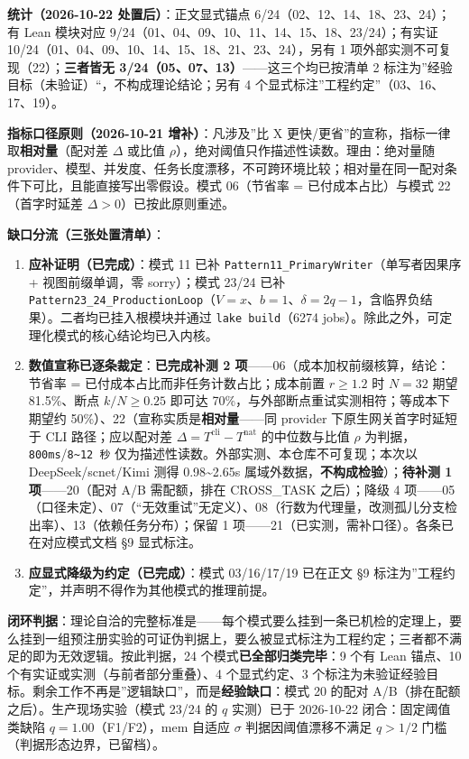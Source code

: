 \textbf{统计（2026-10-22 处置后）}：正文显式锚点
6/24（02、12、14、18、23、24）；有 Lean 模块对应
9/24（01、04、09、10、11、14、15、18、23/24）；有实证
10/24（01、04、09、10、14、15、18、21、23、24），另有 1
项外部实测不可复现（22）；\textbf{三者皆无
3/24（05、07、13）}------这三个均已按清单 2
标注为''经验目标（未验证）``，不构成理论结论；另有 4
个显式标注''工程约定''（03、16、17、19）。

\textbf{指标口径原则（2026-10-21 增补）}：凡涉及''比 X
更快/更省''的宣称，指标一律取\textbf{相对量}（配对差 \(\Delta\) 或比值
\(\rho\)），绝对阈值只作描述性读数。理由：绝对量随
provider、模型、并发度、任务长度漂移，不可跨环境比较；相对量在同一配对条件下可比，且能直接写出零假设。模式
06（节省率 = 已付成本占比）与模式 22（首字时延差
\(\Delta>0\)）已按此原则重述。

\textbf{缺口分流（三张处置清单）}：

\begin{enumerate}
\def\labelenumi{\arabic{enumi}.}
\tightlist
\item
  \textbf{应补证明（已完成）}：模式 11 已补
  \texttt{Pattern11\_PrimaryWriter}（单写者因果序 + 视图前缀单调，零
  sorry）；模式 23/24 已补
  \texttt{Pattern23\_24\_ProductionLoop}（\(V=x\)、\(b=1\)、\(\delta=2q-1\)，含临界负结果）。二者均已挂入根模块并通过
  \texttt{lake\ build}（6274
  jobs）。除此之外，可定理化模式的核心结论均已入内核。
\item
  \textbf{数值宣称已逐条裁定}：\textbf{已完成补测 2
  项}------06（成本加权前缀核算，结论：节省率 =
  已付成本占比而非任务计数占比；成本前置 \(r\ge1.2\) 时 \(N=32\) 期望
  81.5\%、断点 \(k/N\ge0.25\) 即可达
  70\%，与外部断点重试实测相符；等成本下期望约
  50\%）、22（宣称实质是\textbf{相对量}------同 provider
  下原生网关首字时延短于 CLI 路径；应以配对差
  \(\Delta=T^{\text{cli}}-T^{\text{nat}}\) 的中位数与比值 \(\rho\)
  为判据，\texttt{800ms}/\texttt{8\textasciitilde{}12\ 秒}
  仅为描述性读数。外部实测、本仓库不可复现；本次以 DeepSeek/scnet/Kimi
  测得 0.98\textasciitilde2.65s
  属域外数据，\textbf{不构成检验}）；\textbf{待补测 1 项}------20（配对
  A/B 需配额，排在 CROSS\_TASK 之后）；降级 4
  项------05（口径未定）、07（``无效重试''无定义）、08（行数为代理量，改测孤儿分支检出率）、13（依赖任务分布）；保留
  1 项------21（已实测，需补口径）。各条已在对应模式文档 §9 显式标注。
\item
  \textbf{应显式降级为约定（已完成）}：模式 03/16/17/19 已在正文 §9
  标注为''工程约定''，并声明不得作为其他模式的推理前提。
\end{enumerate}

\textbf{闭环判据}：理论自洽的完整标准是------每个模式要么挂到一条已机检的定理上，要么挂到一组预注册实验的可证伪判据上，要么被显式标注为工程约定；三者都不满足的即为无效逻辑。按此判据，24
个模式\textbf{已全部归类完毕}：9 个有 Lean 锚点、10
个有实证或实测（与前者部分重叠）、4 个显式约定、3
个标注为未验证经验目标。剩余工作不再是''逻辑缺口''，而是\textbf{经验缺口}：模式
20 的配对 A/B（排在配额之后）。生产现场实验（模式 23/24 的 \(q\)
实测）已于 2026-10-22 闭合：固定阈值类缺陷 \(q=1.00\)（F1/F2），mem
自适应 \(\sigma\) 判据因阈值漂移不满足 \(q>1/2\)
门槛（判据形态边界，已留档）。
